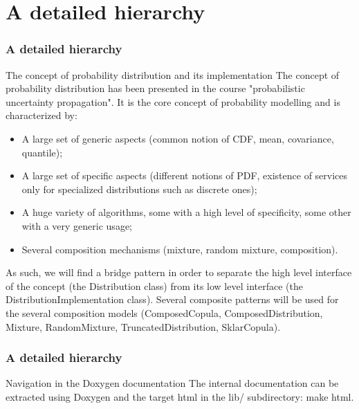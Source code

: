 \documentclass[8pt]{beamer}
\begin{document}
\section[A detailed hierarchy]{A detailed hierarchy}
\begin{frame}
  \frametitle{A detailed hierarchy}
  \begin{block}{The concept of probability distribution and its implementation}
    The concept of probability distribution has been presented in the course "probabilistic uncertainty propagation". It is the core concept of probability modelling and is characterized by:
    \begin{itemize}
    \item A large set of generic aspects (common notion of CDF, mean, covariance, quantile);
    \item A large set of specific aspects (different notions of PDF, existence of services only for specialized distributions such as discrete ones);
    \item A huge variety of algorithms, some with a high level of specificity, some other with a very generic usage;
    \item Several composition mechanisms (mixture, random mixture, composition).
    \end{itemize}
  \end{block}
  As such, we will find a bridge pattern in order to separate the \alert{high level interface} of the concept (the \alert{Distribution class}) from its \alert{low level interface} (the \alert{DistributionImplementation class}). Several composite patterns will be used for the several composition models (ComposedCopula, ComposedDistribution, Mixture, RandomMixture, TruncatedDistribution, SklarCopula).
\end{frame}
\begin{frame}
  \frametitle{A detailed hierarchy}
  \begin{block}{Navigation in the Doxygen documentation}
    The internal documentation can be extracted using Doxygen and the target {\ttfamily html} in the lib/ subdirectory: make html.
  \end{block}
\end{frame}
\end{document}
